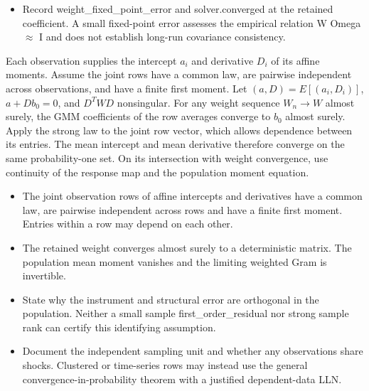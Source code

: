 \expandafter\def\csname statadic@diagnostics@STATADIC-GMM-009\endcsname{\begin{itemize}
\item Record weight\_fixed\_point\_error and solver.converged at the retained coefficient. A small fixed-point error assesses the empirical relation W Omega \ensuremath{\approx} I and does not establish long-run covariance consistency.
\end{itemize}}
\expandafter\def\csname statadic@statement@STATADIC-GMM-010\endcsname{Each observation supplies the intercept $a_i$ and derivative
  $D_i$ of its affine moments. Assume the joint rows have a common law, are
  pairwise independent across observations, and have a finite first moment.
  Let $(a,D)=E[(a_i,D_i)]$, $a+Db_0=0$, and $D^T W D$ nonsingular.
  For any weight sequence $W_n\to W$ almost surely, the GMM coefficients of
  the row averages converge to $b_0$ almost surely.}
\expandafter\def\csname statadic@proof@STATADIC-GMM-010\endcsname{Apply the strong law to the joint row vector, which allows
  dependence between its entries. The mean intercept and mean derivative
  therefore converge on the same probability-one set. On its intersection
  with weight convergence, use continuity of the response map and the
  population moment equation.}
\expandafter\def\csname statadic@assumptions@STATADIC-GMM-010\endcsname{\begin{itemize}
\item The joint observation rows of affine intercepts and derivatives have a common law, are pairwise independent across rows and have a finite first moment. Entries within a row may depend on each other.
\item The retained weight converges almost surely to a deterministic matrix. The population mean moment vanishes and the limiting weighted Gram is invertible.
\end{itemize}}
\expandafter\def\csname statadic@diagnostics@STATADIC-GMM-010\endcsname{\begin{itemize}
\item State why the instrument and structural error are orthogonal in the population. Neither a small sample first\_order\_residual nor strong sample rank can certify this identifying assumption.
\item Document the independent sampling unit and whether any observations share shocks. Clustered or time-series rows may instead use the general convergence-in-probability theorem with a justified dependent-data LLN.
\end{itemize}}
